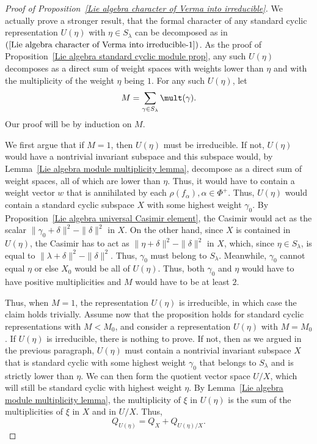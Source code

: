 \begin{proof}[Proof of Proposition~\ref{Lie algebra character of Verma into irreducible}]
We actually prove a stronger result, that the formal character of any standard cyclic representation $U(\eta)$ with $\eta\in S_\lambda$ can be decomposed as in $(\ref{Lie algebra character of Verma into irreducible-1})$. As the proof of Proposition~\ref{Lie algebra standard cyclic module prop}, any such $U(\eta)$ decomposes as a direct sum of weight spaces with weights lower than $\eta$ and with the multiplicity of
the weight $\eta$ being $1$. For any such $U(\eta)$, let
\[M=\sum_{\gamma\in S_\lambda}\mult(\gamma).\]
Our proof will be by induction on $M$.\par
We first argue that if $M=1$, then $U(\eta)$ must be irreducible. If not, $U(\eta)$ would have a nontrivial invariant subspace and this subspace would, by Lemma~\ref{Lie algebra module multiplicity lemma}, decompose as a direct sum of weight spaces, all of which are lower than $\eta$. Thus, it would have to contain a weight vector $w$ that is annihilated by each $\rho(f_\alpha),\alpha\in\Phi^+$. Thus, $U(\eta)$ would contain a standard cyclic subspace $X$ with some highest weight $\gamma_0$. By Proposition~\ref{Lie algebra universal Casimir element}, the Casimir would act as the scalar $\|\gamma_0+\delta\|^2-\|\delta\|^2$ in $X$. On the other hand, since $X$ is contained in $U(\eta)$, the Casimir has to act as $\|\eta+\delta\|^2-\|\delta\|^2$ in $X$, which, since $\eta\in S_\lambda$, is equal to $\|\lambda+\delta\|^2-\|\delta\|^2$. Thus, $\gamma_0$ must belong to $S_\lambda$. Meanwhile, $\gamma_0$ cannot equal $\eta$ or else $X_0$ would be all of $U(\eta)$. Thus, both $\gamma_0$ and $\eta$ would have to have positive multiplicities and $M$ would have to be at least $2$.\par
Thus, when $M=1$, the representation $U(\eta)$ is irreducible, in which case the claim holds trivially. Assume now that the proposition holds for standard cyclic representations with $M<M_0$, and consider a representation $U(\eta)$ with $M=M_0$. If $U(\eta)$ is irreducible, there is nothing to prove. If not, then as we argued in the previous paragraph, $U(\eta)$ must contain a nontrivial invariant subspace $X$ that is standard cyclic with some highest weight $\gamma_0$ that belongs to $S_\lambda$ and is strictly lower than $\eta$. We can then form the quotient vector space $U/X$, which will still be standard cyclic with highest weight $\eta$. By Lemma~\ref{Lie algebra module multiplicity lemma}, the multiplicity of $\xi$ in $U(\eta)$ is the sum of the multiplicities of $\xi$ in $X$ and in $U/X$. Thus,
\[Q_{U(\eta)}=Q_X+Q_{U(\eta)/X}.\]


\end{proof}
